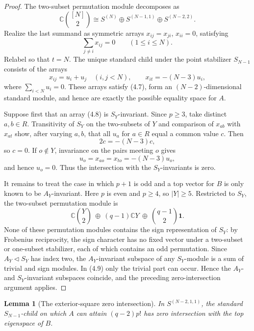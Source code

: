 \documentclass[11pt]{article}
\newtheorem{lemma}[theorem]{Lemma}
\theoremstyle{definition}
\newcommand{\C}{\mathbb C}
\newcommand{\one}{\mathbf 1}
\begin{document}
\begin{proof}
The two-subset permutation module decomposes as
\[
 \C\binom{[N]}2\cong
 S^{(N)}\oplus S^{(N-1,1)}\oplus S^{(N-2,2)}.
\]
Realize the last summand as symmetric arrays $x_{ij}=x_{ji}$, $x_{ii}=0$,
satisfying
\[
 \sum_{j\ne i}x_{ij}=0\qquad(1\leq i\leq N).
 \tag{4.7}
\]
Relabel so that $t=N$.  The unique standard child under the point
stabilizer $S_{N-1}$ consists of the arrays
\[
 x_{ij}=u_i+u_j\quad(i,j<N),\qquad
 x_{it}=-(N-3)u_i,
 \tag{4.8}
\]
where $\sum_{i<N}u_i=0$.  These arrays satisfy (4.7), form an
$(N-2)$-dimensional standard module, and hence are exactly the possible
equality space for $A$.

Suppose first that an array (4.8) is $S_Y$-invariant.  Since $p\geq3$, take
distinct $a,b\in R$.  Transitivity of $S_Y$ on the two-subsets of $Y$ and
comparison of $x_{ab}$ with $x_{at}$ show, after varying $a,b$, that all
$u_a$ for $a\in R$ equal a common value $c$.  Then
\[
 2c=-(N-3)c,
\]
so $c=0$.  If $o\notin Y$, invariance on the pairs meeting $o$ gives
\[
 u_o=x_{ao}=x_{to}=-(N-3)u_o,
\]
and hence $u_o=0$.  Thus the intersection with the $S_Y$-invariants is zero.

It remains to treat the case in which $p+1$ is odd and a top vector for
$B$ is only known to be $A_Y$-invariant.  Here $p$ is even and $p\geq4$, so
$|Y|\geq5$.  Restricted to $S_Y$, the two-subset permutation module is
\[
 \C\binom Y2\ \oplus\ (q-1)\C Y\ \oplus\
 \binom{q-1}{2}\one.
 \tag{4.9}
\]
None of these permutation modules contains the sign representation of
$S_Y$: by Frobenius reciprocity, the sign character has no fixed vector
under a two-subset or one-subset stabilizer, each of which contains an odd
permutation.  Since $A_Y\triangleleft S_Y$ has index two, the
$A_Y$-invariant subspace of any $S_Y$-module is a sum of trivial and sign
modules.  In (4.9) only the trivial part can occur.  Hence the $A_Y$- and
$S_Y$-invariant subspaces coincide, and the preceding zero-intersection
argument applies.
\end{proof}

\begin{lemma}[The exterior-square zero intersection]\label{lem:exterior}
In $S^{(N-2,1,1)}$, the standard $S_{N-1}$-child on which $A$ can attain
$(q-2)p!$ has zero intersection with the top eigenspace of $B$.
\end{lemma}
\end{document}
